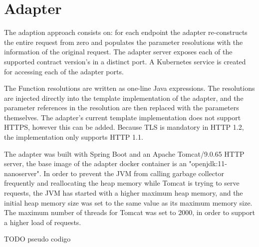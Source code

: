 \section{Adapter} %
\label{sec:adapter}

The adaption approach consists on: for each endpoint the
adapter re-constructs the entire request from zero and populates the parameter resolutions with the information of the original request.
The adapter server exposes each of the supported contract version's in a distinct port.
A Kubernetes service is created for accessing each of the adapter ports.

The Function resolutions are written as one-line Java expressions.
The resolutions are injected directly into the template implementation of the adapter, and the parameter references in the resolution are then replaced with the parameters themselves.
The adapter's current template implementation does not support HTTPS, however this can be added.
Because TLS is mandatory in HTTP 1.2, the implementation only supports HTTP 1.1.

The adapter was built with Spring Boot and an Apache Tomcat/9.0.65 HTTP server, the base image of the adapter docker container is an "openjdk:11-nanoserver".
In order to prevent the JVM from calling garbage collector frequently and reallocating the heap memory while Tomcat is trying to serve requests,
the JVM has started with a higher maximum heap memory, and the initial heap memory
size was set to the same value as its maximum memory size.
The maximum number of threads for Tomcat was set to 2000, in order to support a higher load of requests.

TODO pseudo codigo

